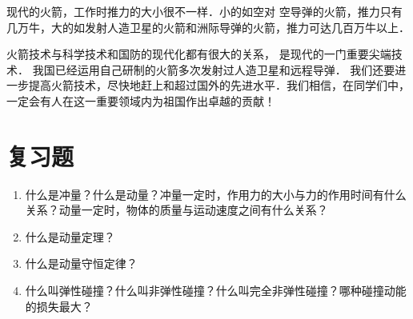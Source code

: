 现代的火箭，工作时推力的大小很不一样．小的如空对
空导弹的火箭，推力只有几万牛，大的如发射人造卫星的火箭和洲际导弹的火箭，推力可达几百万牛以上．

火箭技术与科学技术和国防的现代化都有很大的关系，
是现代的一门重要尖端技术．
我国已经运用自己研制的火箭多次发射过人造卫星和远程导弹．
我们还要进一步提高火箭技术，尽快地赶上和超过国外的先进水平．我们相信，在同学们中，一定会有人在这一重要领域内为祖国作出卓越的贡献！


\section*{复习题}
\begin{enumerate}
    \item 什么是冲量？什么是动量？冲量一定时，作用力的大小与力的作用时间有什么关系？动量一定时，物体的质量与运动速度之间有什么关系？
    \item 什么是动量定理？
    \item 什么是动量守恒定律？
    \item 什么叫弹性碰撞？什么叫非弹性碰撞？什么叫完全非弹性碰撞？哪种碰撞动能的损失最大？
\end{enumerate}


